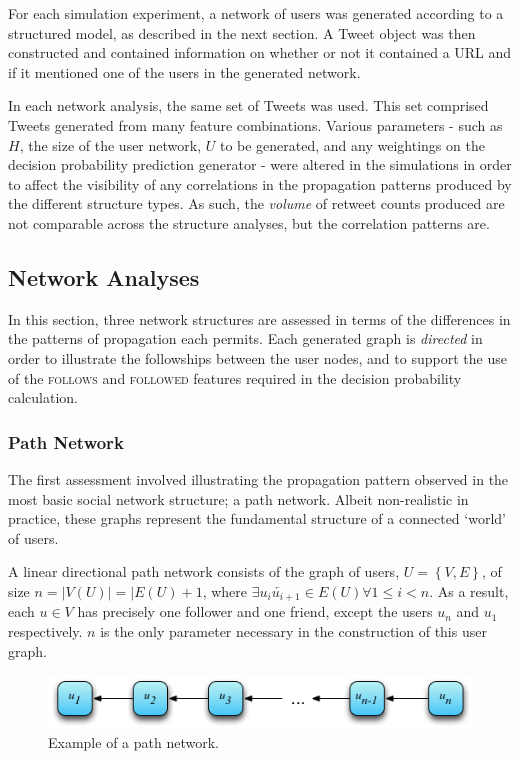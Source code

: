 For each simulation experiment, a network of users was generated according to a structured model, as described in the next section. A Tweet object was then constructed and contained information on whether or not it contained a URL and if it mentioned one of the users in the generated network. 

In each network analysis, the same set of Tweets was used. This set comprised Tweets generated from many feature combinations. Various parameters - such as $H$, the size of the user network, $U$ to be generated, and any weightings on the decision probability prediction generator - were altered in the simulations in order to affect the visibility of any correlations in the propagation patterns produced by the different structure types. As such, the \textit{volume} of retweet counts produced are not comparable across the structure analyses, but the correlation patterns are.


\subsection{Network Analyses}
In this section, three network structures are assessed in terms of the differences in the patterns of propagation each permits. Each generated graph is \textit{directed} in order to illustrate the followships between the user nodes, and to support the use of the \textsc{follows} and \textsc{followed} features required in the decision probability calculation.


\subsubsection{Path Network}
The first assessment involved illustrating the propagation pattern observed in the most basic social network structure; a path network. Albeit non-realistic in practice, these graphs represent the fundamental structure of a connected `world' of users.

A linear directional path network consists of the graph of users, $U = \left\{V,E\right\}$, of size $n = |V(U)| = |E(U) + 1$, where $\exists \overleftarrow{u_i u_{i+1}} \in E(U) \forall 1 \leq i < n$. As a result, each $u \in V$ has precisely one follower and one friend, except the users $u_n$ and $u_1$ respectively. $n$ is the only parameter necessary in the construction of this user graph.

\begin{figure}[h]
\centering
\includegraphics[scale=0.8]{4.Chapter2/Media/path_network.png} 
\caption{Example of a path network.}
\label{fig:path_network}
\end{figure}

